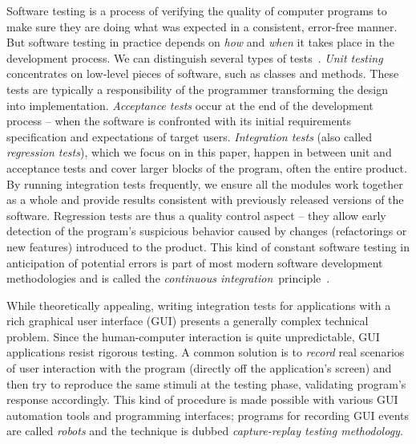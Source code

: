 \documentclass{llncs}
\newcommand{\customtextsc}[1]{{\scriptsize \MakeUppercase{#1}}}
\newcommand{\acro}[1]{\customtextsc{#1}}   %
\newcommand{\gui}{\acro{gui}}              %
\begin{document}
Software testing is a process of verifying the quality of computer programs to make sure they are
doing what was expected in a consistent, error-free manner. But software testing in practice depends
on \emph{how} and \emph{when} it takes place in the development process. We can distinguish several
types of tests~\cite{tcs,softqualiteng}. \emph{Unit testing} concentrates on low-level pieces of
software, such as classes and methods. These tests are typically a responsibility of the programmer
transforming the design into implementation. \emph{Acceptance tests} occur at the end of the
development process -- when the software is confronted with its initial requirements specification
and expectations of target users. \emph{Integration tests} (also called \emph{regression tests}),
which we focus on in this paper, happen in between unit and acceptance tests and cover larger blocks
of the program, often the entire product. By running integration tests frequently, we ensure all the
modules work together as a whole and provide results consistent with previously released versions of
the software. Regression tests are thus a quality control aspect -- they allow early detection 
of the program's suspicious behavior caused by changes (refactorings or new features) introduced to 
the product. This kind of constant software testing in anticipation of potential errors is part of most modern 
software development methodologies and is called the \emph{continuous integration}~principle~\cite{fowler}.

While theoretically appealing, writing integration tests for applications with a rich graphical user
interface (\gui{}) presents a generally complex technical problem. Since the human-computer
interaction is quite unpredictable, \gui{} applications resist rigorous testing.
A common solution is to \emph{record} real scenarios of user interaction with the program (directly
off the application's screen) and then try to reproduce the same stimuli at the testing phase,
validating program's response accordingly. This kind of procedure is made possible with various
\gui{} automation tools and programming interfaces; programs for recording \gui{}
events are called \emph{robots} and the technique is dubbed \emph{capture-replay testing methodology}.
\end{document}
